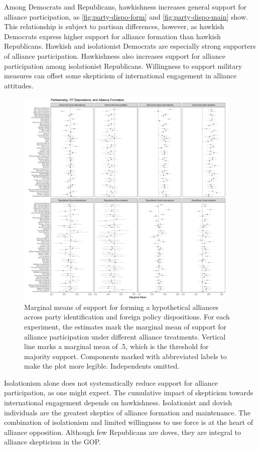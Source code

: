 \documentclass[12pt]{article}
\begin{document}
Among Democrats and Republicans, hawkishness increases general support for alliance participation, as \autoref{fig:party-dispo-form} and \autoref{fig:party-dispo-main} show. 
This relationship is subject to partisan differences, however, as hawkish Democrats express higher support for alliance formation than hawkish Republicans. 
Hawkish and isolationist Democrats are especially strong supporters of alliance participation. 
Hawkishness also increases support for alliance participation among isolationist Republicans. 
Willingness to support military measures can offset some skepticism of international engagement in alliance attitudes. 


\begin{figure}
	\centering
		\includegraphics[width=0.95\textwidth]{../figures/party-dispo-form.png}
	\caption{Marginal means of support for forming a hypothetical alliances across party identification and foreign policy dispositions. For each experiment, the estimates mark the marginal mean of support for alliance participation under different alliance treatments. Vertical line marks a marginal mean of .5, which is the threshold for majority support. Components marked with abbreviated labels to make the plot more legible. Independents omitted.}
	\label{fig:party-dispo-form}
\end{figure}


Isolationism alone does not systematically reduce support for alliance participation, as one might expect.
The cumulative impact of skepticism towards international engagement depends on hawkishness. 
Isolationist and dovish individuals are the greatest skeptics of alliance formation and maintenance. 
The combination of isolationism and limited willingness to use force is at the heart of alliance opposition. 
Although few Republicans are doves, they are integral to alliance skepticism in the GOP. 
\end{document}
